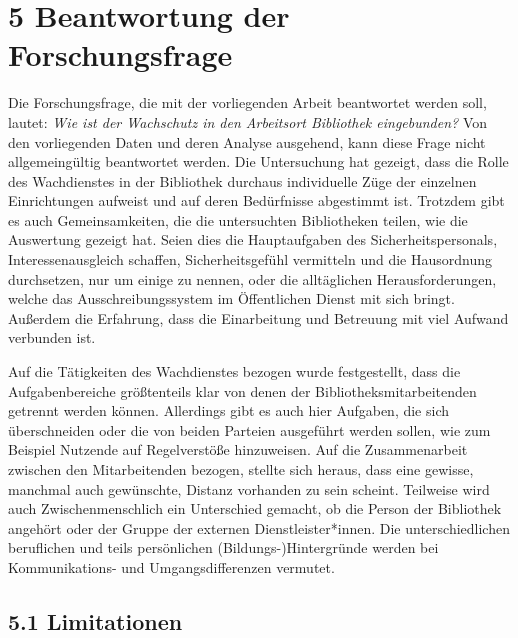 \documentclass[a4paper,
fontsize=11pt,
oneside,
numbers=noperiodatend,
parskip=half-,
bibliography=totoc,
final
]{scrartcl}
\begin{document}
\hypertarget{beantwortung-der-forschungsfrage}{%
\section{5 Beantwortung der
Forschungsfrage}\label{beantwortung-der-forschungsfrage}}

Die Forschungsfrage, die mit der vorliegenden Arbeit beantwortet werden
soll, lautet: \emph{Wie ist der Wachschutz in den Arbeitsort Bibliothek
eingebunden?} Von den vorliegenden Daten und deren Analyse ausgehend,
kann diese Frage nicht allgemeingültig beantwortet werden. Die
Untersuchung hat gezeigt, dass die Rolle des Wachdienstes in der
Bibliothek durchaus individuelle Züge der einzelnen Einrichtungen
aufweist und auf deren Bedürfnisse abgestimmt ist. Trotzdem gibt es auch
Gemeinsamkeiten, die die untersuchten Bibliotheken teilen, wie die
Auswertung gezeigt hat. Seien dies die Hauptaufgaben des
Sicherheitspersonals, Interessenausgleich schaffen, Sicherheitsgefühl
vermitteln und die Hausordnung durchsetzen, nur um einige zu nennen,
oder die alltäglichen Herausforderungen, welche das Ausschreibungssystem
im Öffentlichen Dienst mit sich bringt. Außerdem die Erfahrung, dass die
Einarbeitung und Betreuung mit viel Aufwand verbunden ist.

Auf die Tätigkeiten des Wachdienstes bezogen wurde festgestellt, dass
die Aufgabenbereiche größtenteils klar von denen der
Bibliotheksmitarbeitenden getrennt werden können. Allerdings gibt es
auch hier Aufgaben, die sich überschneiden oder die von beiden Parteien
ausgeführt werden sollen, wie zum Beispiel Nutzende auf Regelverstöße
hinzuweisen. Auf die Zusammenarbeit zwischen den Mitarbeitenden bezogen,
stellte sich heraus, dass eine gewisse, manchmal auch gewünschte,
Distanz vorhanden zu sein scheint. Teilweise wird auch
Zwischenmenschlich ein Unterschied gemacht, ob die Person der Bibliothek
angehört oder der Gruppe der externen Dienstleister*innen. Die
unterschiedlichen beruflichen und teils persönlichen
(Bildungs-)Hintergründe werden bei Kommunikations- und
Umgangsdifferenzen vermutet.

\hypertarget{limitationen}{%
\subsection{5.1 Limitationen}\label{limitationen}}
\end{document}

